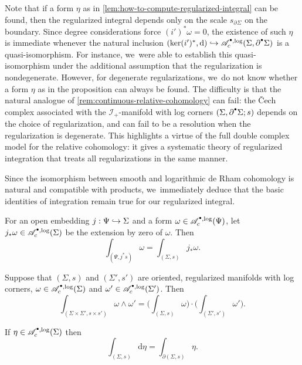 \documentclass[10pt]{amsart}
\let\oldbullet\bullet
\renewcommand{\bullet}{{\raisebox{1pt}{$\scriptscriptstyle\oldbullet$}}}
\newcommand\hto{\mathrel{\lhook\joinrel\to}}
\newcommand{\rbbrac}[1]{\biggl(#1\biggr)}
\theoremstyle{definition}
\theoremstyle{remark}
\newenvironment{remark}
  {\pushQED{\qed}\renewcommand{\qedsymbol}{$\lozenge$}\remarkx}
  {\popQED\endremarkx}
\newcommand{\dd}{\mathrm{d}}
\newcommand{\Alogc}[2][\bullet]{\mathscr{A}^{#1,\log}_c(#2)}
\newcommand{\Sig}{\Sigma}
\newcommand{\bdSig}[1][]{\partial^{#1}\Sigma}
\newcommand{\ascat}{\mathscr{I}_+}
\begin{document}
\begin{remark}
Note that if a form $\eta$ as in \autoref{lem:how-to-compute-regularized-integral} can be found, then the regularized integral depends only on the scale $s_{\bdSig}$ on the boundary. Since degree considerations force $(i')^*\omega = 0$, the existence of such $\eta$ is immediate whenever the natural inclusion $(\ker (i')^*,\dd) \hto \Alogc{\Sig,\bdSig[\bullet]}$ is a quasi-isomorphism. For instance, we~were able to establish this quasi-isomorphism under the additional assumption that the regularization is nondegenerate. However, for degenerate regularizations, we~do not know whether a form $\eta$ as in the proposition can always be found. The difficulty is that the natural analogue of \autoref{rem:continuous-relative-cohomology} can fail: the \v{C}ech complex associated with the $\ascat$-manifold with log corners $(\Sig,\bdSig[\bullet];s)$ depends on the choice of regularization, and can fail to be a resolution when the regularization is degenerate. This highlights a virtue of the full double complex model for the relative cohomology: it gives a systematic theory of regularized integration that treats all regularizations in the same manner.
\end{remark}

Since the isomorphism between smooth and logarithmic de Rham cohomology is natural and compatible with products, we~immediately deduce that the basic identities of integration remain true for our regularized integral.

\begin{corollary}
For an open embedding $j : \Psi \hto \Sig$ and a form $\omega \in \Alogc{\Psi}$, let $j_*\omega \in \Alogc{\Sig}$ be the extension by zero of $\omega$. Then
\[
\int_{(\Psi,j^*s)} \omega = \int_{(\Sig,s)}j_*\omega.
\]
\end{corollary}
\begin{corollary}
Suppose that $(\Sig,s)$ and $(\Sig',s')$ are oriented, regularized manifolds with log corners, $\omega \in \Alogc{\Sig}$ and $\omega' \in \Alogc{\Sig'}$. Then
\[
\int_{(\Sig\times\Sig',s\times s')}\omega \wedge \omega' = \rbbrac{\int_{(\Sig,s)} \omega } \cdot \rbbrac{\int_{(\Sig',s')}\omega'}.
\]
\end{corollary}

\begin{corollary}\label{cor:reg-stokes}
If $\eta \in \Alogc[\bullet]{\Sig}$ then
\[
\int_{(\Sig,s)} \dd \eta = \int_{\partial(\Sig,s)} \eta.
\]
\end{corollary}
\end{document}
